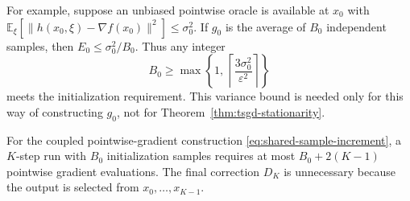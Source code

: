 For example, suppose an unbiased pointwise oracle is available at
$x_0$ with
$\mathbb{E}_{\xi}[\|h(x_0,\xi)-\nabla f(x_0)\|^2]\leq\sigma_0^2$.
If $g_0$ is the average of $B_0$ independent samples, then
$E_0\leq\sigma_0^2/B_0$. Thus any integer
\[
B_0\geq\max\left\{1,\,
\left\lceil\frac{3\sigma_0^2}{\varepsilon^2}\right\rceil\right\}
\]
meets the initialization requirement. This variance bound is needed
only for this way of constructing $g_0$, not for
Theorem~\ref{thm:tsgd-stationarity}.

For the coupled pointwise-gradient construction
\eqref{eq:shared-sample-increment}, a $K$-step run with $B_0$
initialization samples requires at most $B_0+2(K-1)$ pointwise
gradient evaluations. The final correction $D_K$ is unnecessary
because the output is selected from $x_0,\ldots,x_{K-1}$.

